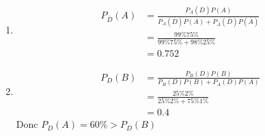 \documentclass[12pt]{report}
\begin{document}
\begin{enumerate}
    \item 
    \begin{align*}
        P_{\overline{D}}(A) &= \frac{P_{A}(\overline{D})P(A)}{P_A(\overline{D})P(A)+ P_{\overline{A}}(\overline{D})P(\overline{A})}\\
        &= \frac{99 \% 75 \%}{99 \% 75\% + 98 \% 25\%}\\
        &= 0.752    
    \end{align*}
    \item 
    \begin{align*}
        P_{D}(B) &=  \frac{P_{B}(D)P(B)}{P_B(D)P(B)+ P_{A}(D)P(A)}\\
        &= \frac{25 \% 2 \%}{25\% 2\% + 75\% 1\%} \\
        &= 0.4  
    \end{align*} 
    Donc $P_D(A) = 60 \% > P_D(B)$
\end{enumerate}

\section{}
\section{}
\section{}
\end{document}
